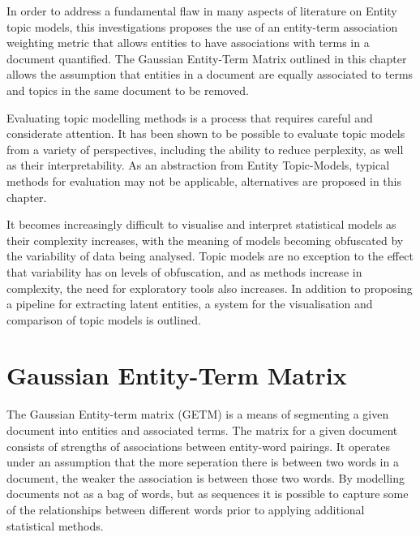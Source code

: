 \documentclass[10pt]{report}
\begin{document}
In order to address a fundamental flaw in many aspects of literature on Entity topic models, this investigations proposes the use of an entity-term association weighting metric that allows entities to have associations with terms in a document quantified. The Gaussian Entity-Term Matrix outlined in this chapter allows the assumption that entities in a document are equally associated to terms and topics in the same document to be removed.

Evaluating topic modelling methods is a process that requires careful and considerate attention. It has been shown to be possible to evaluate topic models from a variety of perspectives, including the ability to reduce perplexity, as well as their interpretability. As an abstraction from Entity Topic-Models, typical methods for evaluation may not be applicable, alternatives are proposed in this chapter.

It becomes increasingly difficult to visualise and interpret statistical models as their complexity increases, with the meaning of models becoming obfuscated by the variability of data being analysed. Topic models are no exception to the effect that variability has on levels of obfuscation, and as methods increase in complexity, the need for exploratory tools also increases. In addition to proposing a pipeline for extracting latent entities, a system for the visualisation and comparison of topic models is outlined.

\section{Gaussian Entity-Term Matrix}

The Gaussian Entity-term matrix (GETM) is a means of segmenting a given document into entities and associated terms. The matrix for a given document consists of strengths of associations between entity-word pairings. It operates under an assumption that the more seperation there is between two words in a document, the weaker the association is between those two  words. By modelling documents not as a bag of words, but as sequences it is possible to capture some of the relationships between different words prior to applying additional statistical methods.
\end{document}

